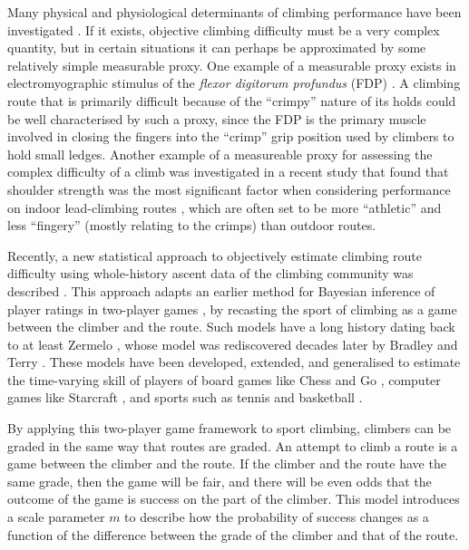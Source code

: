 \documentclass[ba]{imsart}
\begin{document}
Many physical and physiological determinants of climbing performance have been investigated \citep{balavs2012hand, balavs2014relationship, mackenzie2020physical}. If it exists, objective climbing difficulty must be a very complex quantity, but in certain situations it can perhaps be approximated by some relatively simple measurable proxy.  One example of a measurable proxy exists in electromyographic stimulus of the {\it flexor digitorum profundus} (FDP) \citep{delignieres1993psychophysical}.  A climbing route that is primarily difficult because of the ``crimpy'' nature of its holds could be well characterised by such a proxy, since the FDP is the primary muscle involved in closing the fingers into the ``crimp'' grip position used by climbers to hold small ledges.  Another example of a measureable proxy for assessing the complex difficulty of a climb was investigated in a recent study that found that shoulder strength was the most significant factor when considering performance on indoor lead-climbing routes \citep{mackenzie2020physical}, which are often set to be more ``athletic'' and less ``fingery'' (mostly relating to the crimps) than outdoor routes.

Recently, a new statistical approach to objectively estimate climbing route difficulty using whole-history ascent data of the climbing community was described \citep{scarff2020estimation}. This approach adapts an earlier method for Bayesian inference of player ratings in two-player games \citep{coulom2008whole}, by recasting the sport of climbing as a game between the climber and the route. Such models have a long history dating back to at least Zermelo \citep{zermelo1929berechnung}, whose model was rediscovered decades later by Bradley and Terry \citep{bradley1952rank}. These models have been developed, extended, and generalised to estimate the time-varying skill of players of board games like Chess \citep{Elo1978, glickman1999rating} and Go \citep{coulom2008whole}, computer games like Starcraft \citep{maystre2019pairwise}, and sports such as tennis \citep{maystre2019pairwise} and basketball \citep{maystre2019pairwise}.

By applying this two-player game framework to sport climbing, climbers can be graded in the same way that routes are graded. An attempt to climb a route is a game between the climber and the route. If the climber and the route have the same grade, then the game will be fair, and there will be even odds that the outcome of the game is success on the part of the climber. This model introduces a scale parameter $m$ to describe how the probability of success changes as a function of the difference between the grade of the climber and that of the route.
\end{document}
